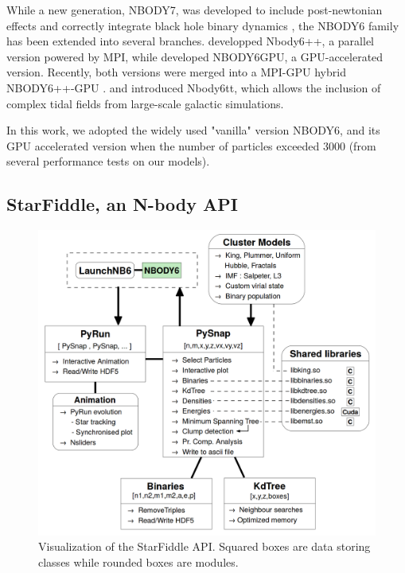 While a new generation, NBODY7, was developed to include post-newtonian effects and correctly integrate black hole binary dynamics \citep{Aarseth2003b}, the NBODY6 family has been extended into several branches. \cite{Spurzem1999} developped Nbody6++, a parallel version powered by MPI, while \cite{Nitadori2012} developed NBODY6GPU, a GPU-accelerated version. Recently, both versions were merged into a MPI-GPU hybrid NBODY6++-GPU \citep{Wang2015}. \cite{Renaud2011} and \cite{Renaud2015} introduced Nbody6tt, which allows the inclusion of complex tidal fields from large-scale galactic simulations.

In this work, we adopted the widely used "vanilla" version NBODY6, and its GPU accelerated version when the number of particles exceeded 3000 (from several performance tests on our models).



\subsection{StarFiddle, an N-body API}



\begin{figure}
\center
\includegraphics[width=\linewidth]{Figures/0_StarFiddle}
\caption[Visualization of the StarFiddle API]{Visualization of the StarFiddle API. Squared boxes are data storing classes while rounded boxes are modules.}
\label{Fig:0_StarFiddle}
\end{figure}


